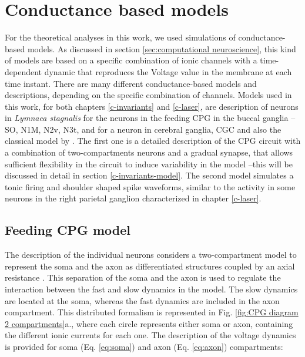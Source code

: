 \section{Conductance based models}
For the theoretical analyses in this work, we used simulations of conductance-based models. As discussed in section \ref{sec:computational neuroscience}, this kind of models are based on a specific combination of ionic channels with a time-dependent dynamic that reproduces the Voltage value in the membrane at each time instant. There are many different conductance-based models and descriptions, depending on the specific combination of channels. Models used in this work, for both chapters \ref{c-invariants} and \ref{c-laser}, are description of neurons in \textit{Lymnaea stagnalis} for the neurons in the feeding CPG in the buccal ganglia --SO, N1M, N2v, N3t, \parencite{vavoulis_dynamic_2007} and for a neuron in cerebral ganglia, CGC \parencite{vavoulis_balanced_2010} and also the classical model by \textcite{hodgkin_quantitative_1952}. The first one is a detailed description of the CPG circuit with a combination of two-compartments neurons and a gradual synapse, that allows sufficient flexibility in the circuit to induce variability in the model --this will be discussed in detail in section \ref{c-invariants-model}. The second model simulates a tonic firing and shoulder shaped spike waveforms, similar to the activity in some neurons in the right parietal ganglion characterized in chapter \ref{c-laser}.

\subsection{Feeding CPG model}
\label{sec:CPG model equations}
The \textcite{vavoulis_dynamic_2007} description of the individual neurons considers a two-compartment model to represent the soma and the axon as  differentiated structures coupled by an axial resistance \parencite{vavoulis_dynamic_2007}. This separation of the soma and the axon is used to regulate the interaction between the fast and slow dynamics in the model. The slow dynamics are located at the soma, whereas the fast dynamics are included in the axon compartment. This distributed formalism is represented in Fig. \ref{fig:CPG diagram 2 compartments}a., where each circle represents either soma or axon, containing the different ionic currents for each one. The description of the voltage dynamics is provided for soma (Eq. \ref{eq:soma}) and axon (Eq. \ref{eq:axon}) compartments:

